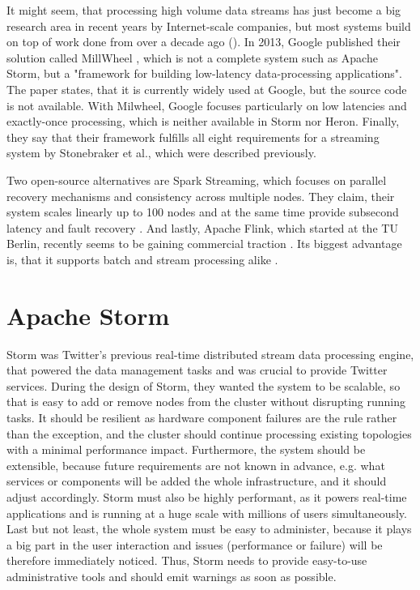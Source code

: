 \documentclass[conference]{IEEEtran}
\begin{document}
It might seem, that processing high volume data streams has just become a big research area in recent years by Internet-scale companies, but most systems build on top of work done from over a decade ago (\cite{StreamStanford, Aurora}).
In 2013, Google published their solution called MillWheel \cite{Millwheel}, which is not a complete system such as Apache Storm, but a "framework for building low-latency data-processing applications".
The paper states, that it is currently widely used at Google, but the source code is not available.
With Milwheel, Google focuses particularly on low latencies and exactly-once processing, which is neither available in Storm nor Heron.
Finally, they say that their framework fulfills all eight requirements for a streaming system by Stonebraker et al., which were described previously.

Two open-source alternatives are Spark Streaming, which focuses on parallel recovery mechanisms and consistency across multiple nodes.
They claim, their system scales linearly up to 100 nodes and at the same time provide subsecond latency and fault recovery \cite{SparkStreaming}.
And lastly, Apache Flink, which started at the TU Berlin, recently seems to be gaining commercial traction \cite{FlinkUpcoming}.
Its biggest advantage is, that it supports batch and stream processing alike \cite{Flink}.

\section{Apache Storm}
\label{sec:ApacheStorm}

Storm was Twitter's previous real-time distributed stream data processing engine, that powered the data management tasks and was crucial to provide Twitter services.
During the design of Storm, they wanted the system to be scalable, so that is easy to add or remove nodes from the cluster without disrupting running tasks.
It should be resilient as hardware component failures are the rule rather than the exception, and the cluster should continue processing existing topologies with a minimal performance impact.
Furthermore, the system should be extensible, because future requirements are not known in advance, e.g. what services or components will be added the whole infrastructure, and it should adjust accordingly.
Storm must also be highly performant, as it powers real-time applications and is running at a huge scale with millions of users simultaneously.
Last but not least, the whole system must be easy to administer, because it plays a big part in the user interaction and issues (performance or failure) will be therefore immediately noticed.
Thus, Storm needs to provide easy-to-use administrative tools and should emit warnings as soon as possible.
\end{document}
